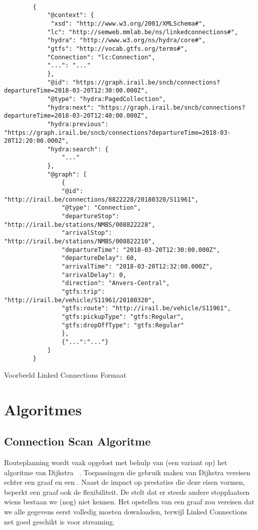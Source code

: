 \begin{code}
	\begin{verbatim}
		
		{
			"@context": {
			 "xsd": "http://www.w3.org/2001/XMLSchema#",
			"lc": "http://semweb.mmlab.be/ns/linkedconnections#",
			"hydra": "http://www.w3.org/ns/hydra/core#",
			"gtfs": "http://vocab.gtfs.org/terms#",
			"Connection": "lc:Connection",
			"...": "..."
			},
			"@id": "https://graph.irail.be/sncb/connections?departureTime=2018-03-20T12:30:00.000Z",
			"@type": "hydra:PagedCollection",
			"hydra:next": "https://graph.irail.be/sncb/connections?departureTime=2018-03-20T12:40:00.000Z",
			"hydra:previous": "https://graph.irail.be/sncb/connections?departureTime=2018-03-20T12:20:00.000Z",
			"hydra:search": {
				"..."
			},
			"@graph": [
				{
				"@id": "http://irail.be/connections/8822228/20180320/S11961",
				"@type": "Connection",
				"departureStop": "http://irail.be/stations/NMBS/008822228",
				"arrivalStop": "http://irail.be/stations/NMBS/008822210",
				"departureTime": "2018-03-20T12:30:00.000Z",
				"departureDelay": 60,
				"arrivalTime": "2018-03-20T12:32:00.000Z",
				"arrivalDelay": 0,
				"direction": "Anvers-Central",
				"gtfs:trip": "http://irail.be/vehicle/S11961/20180320",
				"gtfs:route": "http://irail.be/vehicle/S11961",
				"gtfs:pickupType": "gtfs:Regular",
				"gtfs:dropOffType": "gtfs:Regular"
				},
				{"...":"..."}
			]
		}
	\end{verbatim}
\caption{Voorbeeld Linked Connections Formaat}
\label{code:2:linkedconnections-response}
\end{code}
\section{Algoritmes}
\label{sec:algoritmes}
\subsection{Connection Scan Algoritme}
\label{sec:csa}
Routeplanning wordt vaak opgelost met behulp van (een variant op) het algoritme van Dijkstra ~\citep{strasser13,hanneman07,}. Toepassingen die gebruik maken van Dijkstra vereisen echter een graaf en een . Naast de impact op prestaties die deze eisen vormen, beperkt een graaf ook de flexibiliteit. De  stelt dat er steeds andere stopplaatsen wiens bestaan we (nog) niet kennen. Het opstellen van een graaf zou vereisen dat we alle gegevens eerst volledig moeten downloaden, terwijl Linked Connections net goed geschikt is voor streaming. 


